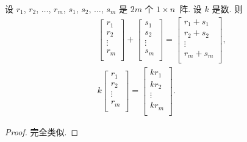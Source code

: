 \begin{theorem}
    设
    \(r_1\), \(r_2\), \(\dots\), \(r_m\),
    \(s_1\), \(s_2\), \(\dots\), \(s_m\)
    是 \(2m\) 个 \(1 \times n\)~阵.
    设 \(k\) 是数.
    则
    \begin{align*}
         & \begin{bmatrix}
               r_1    \\
               r_2    \\
               \vdots \\
               r_m    \\
           \end{bmatrix}
        + \begin{bmatrix}
              s_1    \\
              s_2    \\
              \vdots \\
              s_m    \\
          \end{bmatrix}
        = \begin{bmatrix}
              r_1 + s_1 \\
              r_2 + s_2 \\
              \vdots    \\
              r_m + s_m \\
          \end{bmatrix},   \\
         & k\begin{bmatrix}
                r_1    \\
                r_2    \\
                \vdots \\
                r_m    \\
            \end{bmatrix}
        = \begin{bmatrix}
              kr_1   \\
              kr_2   \\
              \vdots \\
              kr_m   \\
          \end{bmatrix}.
    \end{align*}
\end{theorem}

\begin{proof}
    完全类似.
\end{proof}

\KunAsteriskoEnEnhavtabelo
